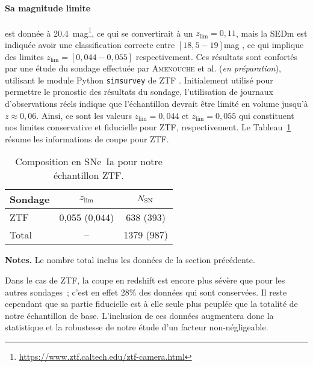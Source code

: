 \documentclass[../main/main.tex]{subfiles}
\begin{document}
\paragraph*{Sa magnitude limite} est donnée à
\SI{20.4}{mag}\footnote{\href{https://www.ztf.caltech.edu/ztf-camera.html}
{https://www.ztf.caltech.edu/ztf-camera.html}}, ce qui se convertirait à un
$z_{\lim} = 0,11$, mais la SEDm est indiquée avoir une classification correcte
entre $[18,5-19]$\si{mag} \citep{fremling2020}, ce qui implique des limites
$z_{\lim} = [0,044-0,055]$ respectivement. Ces résultats sont confortés par une
étude du sondage effectuée par \textsc{Amenouche} et al. (\textit{en
préparation}), utilisant le module Python \texttt{simsurvey} de ZTF
\citep{feindt2019}. Initialement utilisé pour permettre le pronostic des
résultats du sondage, l'utilisation de journaux d'observations réels indique que
l'échantillon devrait être limité en volume jusqu'à $z \approx 0,06$. Ainsi, ce
sont les valeurs $z_{\lim} = 0,044$ et $z_{\lim} = 0,055$ qui constituent nos
limites conservative et fiducielle pour ZTF, respectivement. Le
Tableau~\ref{tab:zlimztf} résume les informations de coupe pour ZTF.

\begin{table}[ht]
    \centering
    \begin{threeparttable}
        \caption{Composition en SNe~Ia pour notre échantillon ZTF.}
        \label{tab:zlimztf}
        \begin{tabular}{lcc}
            \toprule
            Sondage & $z_{\lim}$ & $N_{\rm SN}$\\
            \midrule
            ZTF & 0,055 (0,044) & 638 (393) \\
            \midrule
            Total & -- & 1379 (987)\\
            \bottomrule
        \end{tabular}
        \begin{tablenotes}[flushleft]
            \item \textbf{\hspace{-3,2pt}Notes.} Le nombre total inclus les
                données de la section précédente.
        \end{tablenotes}
    \end{threeparttable}
\end{table}


Dans le cas de ZTF, la coupe en redshift est encore plus sévère que pour les
autres sondages~; c'est en effet 28\% des données qui sont conservées. Il reste
cependant que sa partie fiducielle est à elle seule plus peuplée que la totalité
de notre échantillon de base. L'inclusion de ces données augmentera donc la
statistique et la robustesse de notre étude d'un facteur non-négligeable.
\end{document}
